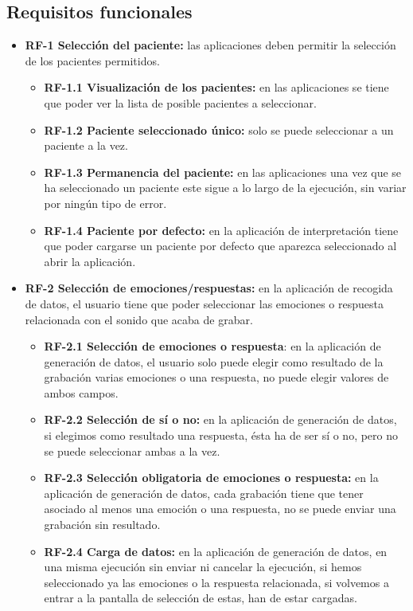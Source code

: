 \subsection{Requisitos funcionales}
\begin{itemize}
	\item \textbf{RF-1 Selección del paciente:} las aplicaciones deben permitir la selección de los pacientes permitidos.
	\begin{itemize}
		\item \textbf{RF-1.1 Visualización de los pacientes:} en las aplicaciones se tiene que poder ver la lista de posible pacientes a seleccionar.
		\item \textbf{RF-1.2 Paciente seleccionado único:} solo se puede seleccionar a un paciente a la vez.
		\item \textbf{RF-1.3 Permanencia del paciente:} en las aplicaciones una vez que se ha seleccionado un paciente este sigue a lo largo de la ejecución, sin variar por ningún tipo de error.
		\item \textbf{RF-1.4 Paciente por defecto:} en la aplicación de interpretación tiene que poder cargarse un paciente por defecto que aparezca seleccionado al abrir la aplicación.
	\end{itemize}
	\item \textbf{RF-2 Selección de emociones/respuestas:} en la aplicación de recogida de datos, el usuario tiene que poder seleccionar las emociones o respuesta relacionada con el sonido que acaba de grabar.
	\begin{itemize}
		\item \textbf{RF-2.1 Selección de emociones o respuesta}: en la aplicación de generación de datos, el usuario solo puede elegir como resultado de la grabación varias emociones o una respuesta, no puede elegir valores de ambos campos.
		\item \textbf{RF-2.2 Selección de sí o no:} en la aplicación de generación de datos, si elegimos como resultado una respuesta, ésta ha de ser sí o no, pero no se puede seleccionar ambas a la vez.
		\item \textbf{RF-2.3 Selección obligatoria de emociones o respuesta:} en la aplicación de generación de datos, cada grabación tiene que tener asociado al menos una emoción o una respuesta, no se puede enviar una grabación sin resultado.
		\item \textbf{RF-2.4 Carga de datos:} en la aplicación de generación de datos, en una misma ejecución sin enviar ni cancelar la ejecución, si hemos seleccionado ya las emociones o la respuesta relacionada, si volvemos a entrar a la pantalla de selección de estas, han de estar cargadas.

\end{itemize}
\end{itemize}
